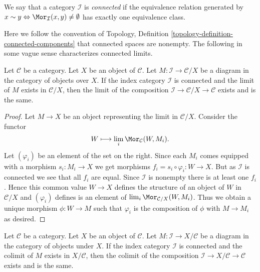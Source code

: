 \begin{definition}
\label{definition-category-connected}
We say that a category $\mathcal{I}$ is {\it connected}
if the equivalence relation generated by
$x \sim y \Leftrightarrow \Mor_\mathcal{I}(x, y) \not = \emptyset$
has exactly one equivalence class.
\end{definition}

\noindent
Here we follow the convention of
Topology, Definition \ref{topology-definition-connected-components}
that connected spaces are nonempty.
The following in some vague sense characterizes connected limits.

\begin{lemma}
\label{lemma-connected-limit-over-X}
Let $\mathcal{C}$ be a category.
Let $X$ be an object of $\mathcal{C}$.
Let $M : \mathcal{I} \to \mathcal{C}/X$ be a diagram
in the category of objects over $X$.
If the index category $\mathcal{I}$ is connected
and the limit of $M$ exists in $\mathcal{C}/X$,
then the limit of the composition
$\mathcal{I} \to \mathcal{C}/X \to \mathcal{C}$
exists and is the same.
\end{lemma}

\begin{proof}
Let $M \to X$ be an object representing the limit in $\mathcal{C}/X$.
Consider the functor
$$
W \longmapsto \lim_i \Mor_\mathcal{C}(W, M_i).
$$
Let $(\varphi_i)$ be an element of the set on the right.
Since each $M_i$ comes equipped with a morphism $s_i : M_i \to X$ we
get morphisms $f_i = s_i \circ \varphi_i : W \to X$. But as $\mathcal{I}$
is connected we see that all $f_i$ are equal. Since $\mathcal{I}$
is nonempty there is at least one $f_i$.
Hence this common value $W \to X$ defines the structure of an
object of $W$ in $\mathcal{C}/X$ and $(\varphi_i)$ defines is an
element of $\lim_i \Mor_{\mathcal{C}/X}(W, M_i)$.
Thus we obtain a unique morphism $\phi : W \to M$ such that
$\varphi_i$ is the composition of $\phi$ with $M \to M_i$ as desired.
\end{proof}

\begin{lemma}
\label{lemma-connected-colimit-under-X}
Let $\mathcal{C}$ be a category.
Let $X$ be an object of $\mathcal{C}$.
Let $M : \mathcal{I} \to X/\mathcal{C}$ be a diagram
in the category of objects under $X$.
If the index category $\mathcal{I}$ is connected
and the colimit of $M$ exists in $X/\mathcal{C}$,
then the colimit of the composition
$\mathcal{I} \to X/\mathcal{C} \to \mathcal{C}$
exists and is the same.
\end{lemma}

